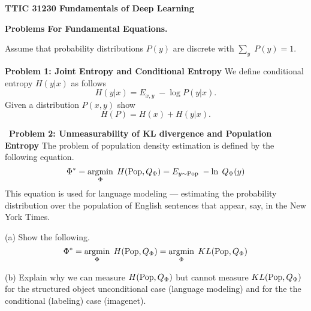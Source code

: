 \documentclass{article}
\newcommand{\solution}[1]{}
\begin{document}
\centerline{\bf TTIC 31230 Fundamentals of Deep Learning}
\centerline{\bf Problems For Fundamental Equations.}

\vfill
\vfill
Assume that probability distributions $P(y)$ are discrete with $\sum_y\;P(y) = 1$.

\bigskip
{\bf Problem 1: Joint Entropy and Conditional Entropy}
We define conditional entropy $H(y|x)$ as follows
$$H(y|x) = E_{x,y} \;-\log P(y|x).$$
Given a distribution $P(x,y)$ show
$$H(P) = H(x) + H(y|x).$$

\solution{
\begin{eqnarray*}
  H(P) & = &  E_{(x,y) \sim P}\;-\ln P(x,y) \\
  \\
  & = & E_{(x,y) \sim P}\;-\ln P(x)P(y|x) \\
  \\
  & = & E_{(x,y) \sim P}\;\left(-\ln P(x) - \ln P(y|x)\right) \\
  \\
  & = & \left(E_{(x,y) \sim P}\;-\ln P(x)\right) + \left(E_{(x,y) \sim P}\;- \ln P(y|x)\right) \\
  \\
  & = & H(x) + H(y|x)
\end{eqnarray*}
}

\bigskip
~{\bf Problem 2: Unmeasurability of KL divergence and Population Entropy} The problem
of population density estimation is defined by the following equation.
$$\Phi^* = \operatorname*{argmin}_\Phi\;H(\mathrm{Pop},Q_\Phi) = E_{y \sim \mathrm{Pop}}\;-\ln\;Q_\Phi(y)$$
This equation is used for language modeling --- estimating the probability distribution over the population of English sentences that appear, say, in the New York Times.

\medskip
(a) Show the following.
$$\Phi^* = \operatorname*{argmin}_\Phi\;H(\mathrm{Pop},Q_\Phi) = \operatorname*{argmin}_\Phi \;KL(\mathrm{Pop},Q_\Phi)$$



\solution{
  $$\argmin_\Phi \;KL(\mathrm{Pop},Q_\Phi) = \argmin_\Phi \;H(\pop,Q_\Phi) - H(\pop)$$
  Since $H(\pop)$ does not depend on $\Phi$ the minima are the same.
}

\bigskip
(b) Explain why we can measure $H(\mathrm{Pop},Q_\Phi)$ but cannot measure $KL(\mathrm{Pop},Q_\Phi)$ for the structured object unconditional case (language modeling) and for the
the conditional (labeling) case (imagenet).
\end{document}
